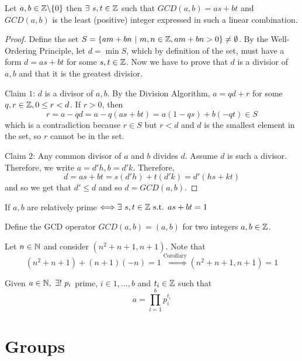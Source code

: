 \documentclass[12pt]{scrartcl}
\begin{document}
\begin{lemma}
  Let $a, b \in \mathbb Z \backslash \{0\}$ then $\exists \ s, t \in \mathbb Z$ such that $GCD(a, b) = as + bt$
  and $GCD(a, b)$ is the least (positive) integer expressed in such a linear combination.

  \begin{proof}
    
    \hfill

    Define the set $S = \{am + bn \ | \ m, n \in \mathbb Z, am + bn > 0\} \neq \emptyset$. By the 
    Well-Ordering Principle, let $d = \min S$, which by definition of the set, must have a form 
    $d = as + bt$ for some $s, t \in \mathbb Z$. Now we have to prove that $d$ is a divisior of $a, b$ and that 
    it is the greatest divisior.

    Claim $1$: $d$ is a divisor of $a, b$. By the Division Algorithm, $a = qd + r$ for some $q, r \in \mathbb Z, 0 \leq r < d$.
    If $r > 0$, then
    \[r = a - qd = a - q(as + bt) = a(1-qs) + b(-qt) \in S\]
    which is a contradiction because $r \in S$ but $r < d$ and $d$ is the smallest element in the set, so $r$ cannot be in the set. 
    
    Claim $2$: Any common divisor of $a$ and $b$ divides $d$. Assume $d$ is such a divisor. Therefore, 
    we write $a = d' h, b = d'k$. Therefore, 
    \[d = as + bt = s(d'h) + t(d'k) = d'(hs + kt)\]
    and so we get that $d' \leq d$ and so $d = GCD(a, b)$. 

  \end{proof}
\end{lemma}

\begin{corollary}
  If $a, b$ are relatively prime $\Longleftrightarrow \exists \ s, t \in \mathbb Z \text{ s.t. } as + bt = 1$
\end{corollary}

\begin{note}
  Define the GCD operator $GCD(a, b) = (a, b)$ for two integers $a, b \in \mathbb Z$.
\end{note}

\begin{example}
  Let $n \in \mathbb N$ and consider $(n^2 + n + 1, n + 1)$. Note that 
  \[(n^2 + n + 1) + (n + 1)(-n) = 1 \overset{\text{Corollary}}{\Longrightarrow} (n^2 + n + 1, n + 1) = 1\]
\end{example}

\begin{theorem}
  Given $a \in \mathbb N, \ \exists! \ p_i$ prime, $ i \in 1, \ldots, b$ and $t_i \in \mathbb Z$
  such that 
  \[a = \prod_{i=1}^b p_i^{t_i}\]
\end{theorem}

\section{Groups}
\end{document}
